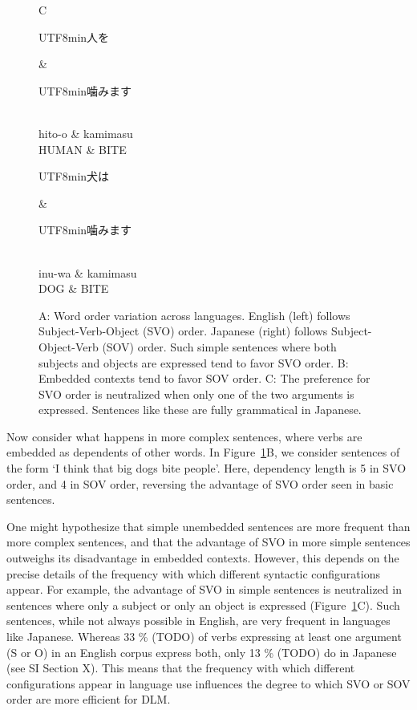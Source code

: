 \documentclass[11pt,a4paper]{article}
\newcommand{\japanese}[1]{\begin{CJK}{UTF8}{min}#1\end{CJK}}
\begin{document}
\begin{figure}
C
\begin{dependency}[theme = simple]
   \begin{deptext}[column sep=1em]
   \japanese{人を} \& \japanese{噛みます}\\ 
   hito-o \& kamimasu \\
   HUMAN \& BITE  \\
   \end{deptext}
\end{dependency}
\begin{dependency}[theme = simple]
   \begin{deptext}[column sep=1em]
   \japanese{犬は} \& \japanese{噛みます}\\ 
   inu-wa \& kamimasu \\
          DOG \& BITE  \\
   \end{deptext}
\end{dependency}

        \caption{A: Word order variation across languages. English (left) follows Subject-Verb-Object (SVO) order. Japanese (right) follows Subject-Object-Verb (SOV) order. Such simple sentences where both subjects and objects are expressed tend to favor SVO order. B: Embedded contexts tend to favor SOV order. C: The preference for SVO order is neutralized when only one of the two arguments is expressed. Sentences like these are fully grammatical in Japanese.}
        \label{fig:sent-dep}
\end{figure}

Now consider what happens in more complex sentences, where verbs are embedded as dependents of other words.
In Figure~\ref{fig:sent-dep}B, we consider sentences of the form `I think that big dogs bite people'.
Here, dependency length is 5 in SVO order, and 4 in SOV order, reversing the advantage  of SVO order seen in basic sentences.

One might hypothesize that simple unembedded sentences are more frequent than more complex sentences, and that the advantage of SVO in more simple sentences outweighs its disadvantage in embedded contexts.
However, this depends on the precise details of the frequency with which different syntactic configurations appear.
For example, the advantage of SVO in simple sentences is neutralized in sentences where only a subject or only an object is expressed (Figure~\ref{fig:sent-dep}C).
Such sentences, while not always possible in English, are very frequent in languages like Japanese.
Whereas 33 \% (TODO)  of verbs expressing at least one argument (S or O) in an English corpus express both, only 13 \% (TODO) do in Japanese (see SI Section X).
This means that the frequency with which different configurations appear in language use influences the degree to which SVO or SOV order are more efficient for DLM.
\end{document}
